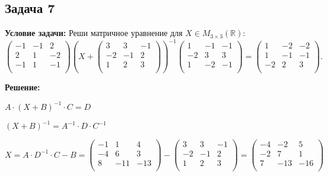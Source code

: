 \documentclass[a4paper,12pt]{article}
\begin{document}
\subsection{Задача 7}
\textbf{Условие задачи:}
Реши матричное уравнение для $X \in M_{3 \times 3}(\mathbb{R})$:
\[
\begin{pmatrix}
-1 & -1 & 2 \\
2 & 1 & -2 \\
-1 & 1 & -1 \\
\end{pmatrix}
\left( X + 
\begin{pmatrix}
3 & 3 & -1 \\
-2 & -1 & 2 \\
1 & 2 & 3 \\
\end{pmatrix} \right)^{-1}
\begin{pmatrix}
1 & -1 & -1 \\
-2 & 3 & 3 \\
1 & -2 & -1 \\
\end{pmatrix} =
\begin{pmatrix}
1 & -2 & -2 \\
1 & -1 & -1 \\
-2 & 2 & 3 \\
\end{pmatrix}.
\]

\textbf{Решение: }

$A\cdot (X+B)^{-1}\cdot C = D$

$(X+B)^{-1}=A^{-1}\cdot D\cdot C^{-1}$

$X=A\cdot D^{-1}\cdot C - B=
\begin{pmatrix}
-1 & 1 & 4 \\
-4 & 6 & 3 \\
8 & -11 & -13 \\
\end{pmatrix}-
\begin{pmatrix}
3 & 3 & -1 \\
-2 & -1 & 2 \\
1 & 2 & 3 \\
\end{pmatrix}=
\begin{pmatrix}

-4 & -2 & 5 \\
-2 & 7 & 1 \\
7 & -13 & -16 \\
\end{pmatrix}
$
\end{document}
